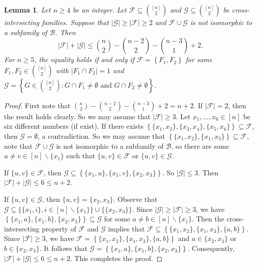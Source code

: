 \documentclass[11pt]{article}
\numberwithin{equation}{section}
\newtheorem{lemma}[theorem]{Lemma}
\begin{document}
\begin{lemma}\label{HK32}
Let $n \geq 4$ be an integer. Let $\mathcal{F} \subseteq\binom{[n]}{2}$ and $\mathcal{G} \subseteq\binom{[n]}{2}$ be  cross-intersecting families. Suppose that $|\mathcal{G}| \geq|\mathcal{F}| \geq 2$ and $\mathcal{F}\cup \mathcal{G}$ is not isomorphic to a subfamily of $\mathcal{B}$. Then
$$
|\mathcal{F}|+|\mathcal{G}| \leq\binom{n}{2}-\binom{n-2}{2}-\binom{n-3}{1}+2.
$$
For $n \geq 5$, the equality holds if and only if $\mathcal{F}=\left\{F_1, F_2\right\}$ for some $F_1, F_2 \in\binom{[n]}{2}$ with $\left|F_1 \cap F_2\right|=1$ and $\mathcal{G}=\left\{G \in\binom{[n]}{2}: G \cap F_1 \neq \emptyset \text{ and } G \cap F_2 \neq \emptyset\right\}$.
\end{lemma}
\begin{proof}
First note that
$
\binom{n}{2}-\binom{n-2}{2}-\binom{n-3}{1}+2=n+2.
$
If $|\mathcal{F}|=2$, then the result holds clearly.
So we may assume that  $|\mathcal{F}|\geq 3$. Let $x_1, \ldots, x_6\in [n]$ be six different numbers (if exist). If there exists $\left\{\{x_1, x_2\}, \{x_3, x_4\}, \{x_5, x_6\}\right\}\subseteq \mathcal{F}$, then $\mathcal{G}=\emptyset$, a contradiction. So we may assume that $\left\{\{x_1, x_2\}, \{x_1, x_3\}\right\}\subseteq \mathcal{F}$, note that $\mathcal{F}\cup \mathcal{G}$ is not isomorphic to a subfamily of $\mathcal{B}$, so
there are some $u\neq v \in  [n]\backslash \{x_1\}$ such that $\{u, v\}\in  \mathcal{F}$ or  $\{u, v\}\in  \mathcal{G}$.

If $\{u, v\}\in  \mathcal{F}$, then $ \mathcal{G}\subseteq\left\{\{x_1, u\}, \{x_1, v\}, \{x_2, x_3\}\right\}$. So $|\mathcal{G}|\leq 3$. Then $|\mathcal{F}|+|\mathcal{G}| \leq 6\leq n+2$.

If $\{u, v\}\in  \mathcal{G}$, then $\{u, v\}=\{x_2, x_3\}$. Observe that
$
\mathcal{G}\subseteq \{\{x_1,i\}, i\in [n]\backslash \{x_1\} \}\cup  \{\{x_2, x_3\}\}
$.
Since $|\mathcal{G}| \geq|\mathcal{F}| \geq 3$, we have $\left\{\{x_1, a\}, \{x_1, b\}, \{x_2, x_3\}\right\}\subseteq \mathcal{G}$ for some $a\neq b \in  [n]\backslash \{x_1\}$. Then the cross-intersecting property of $\mathcal{F}$ and $\mathcal{G}$ implies that $ \mathcal{F}\subseteq\left\{\{x_1, x_2\}, \{x_1, x_3\}, \{a, b\}\right\}$. Since $|\mathcal{F}|\geq 3$, we have $ \mathcal{F}=\left\{\{x_1, x_2\}, \{x_1, x_3\}, \{a, b\}\right\}$ and $a\in \{x_2, x_3\}$ or $b\in \{x_2, x_3\}$. It follows that $\mathcal{G}=\left\{\{x_1, a\}, \{x_1, b\}, \{x_2, x_3\}\right\}$. Consequently, $|\mathcal{F}|+|\mathcal{G}| \leq 6\leq n+2$. This completes the proof.
\end{proof}
\end{document}
